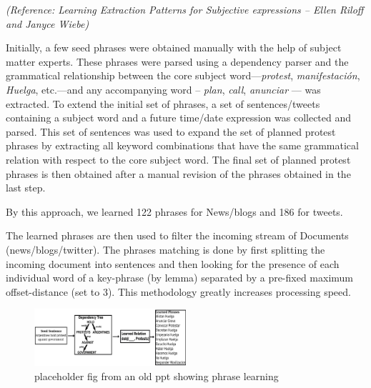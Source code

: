 
{\em (Reference: Learning Extraction Patterns for Subjective expressions -- Ellen Riloff and Janyce Wiebe)}

Initially, a few seed phrases were obtained manually
with the help of subject matter experts. These phrases were parsed
using a dependency parser and the grammatical relationship between the
core subject word---{\em protest}, {\em manifestación}, {\em Huelga},
etc.---and any accompanying word -- {\em plan}, {\em call}, {\em anunciar} --- was extracted. To extend the initial set of phrases, a set of sentences/tweets containing a subject word and a
future time/date expression was collected and parsed.  This set of
sentences was used to expand the set of planned protest phrases by
extracting all keyword combinations that have the same grammatical
relation with respect to the core subject word. The final set of
planned protest phrases is then obtained after a manual revision of
the phrases obtained in the last step.

By this approach, we learned 122 phrases for News/blogs and 186 for tweets.


The learned phrases are then used to filter the incoming stream of Documents (news/blogs/twitter). The phrases matching is done by first splitting the incoming document into sentences and then looking for the presence of each individual word of a key-phrase (by lemma) separated by a pre-fixed maximum offset-distance (set to 3). This methodology greatly increases processing speed.

\begin{figure}
\caption{placeholder fig from an old ppt showing phrase learning}
\includegraphics[width=0.5\textwidth]{figures/phraseLearning}
\end{figure}
